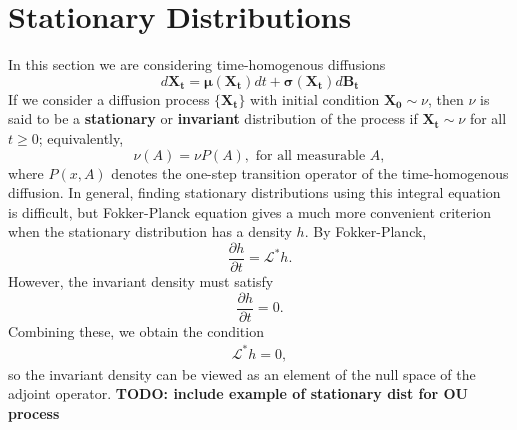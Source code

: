 \documentclass[12pt]{article}
\newcommand{\B}[1]{\boldsymbol{#1}}
\newcommand{\state}[1][t]{X_{#1}}
\newcommand{\BM}[1][t]{B_{#1}} %
\newcommand{\gen}{\mathcal{L}} %
\newcommand{\invariantDens}{h} %
\begin{document}
\section{Stationary Distributions}
In this section we are considering time-homogenous diffusions 
\[
d\B\state = \B\mu(\B\state) dt + \B\sigma(\B\state) d\B\BM
\]
If we consider a diffusion process $\{\B\state\}$ with initial condition $\B{\state[0]} \sim \nu$, then $\nu$ is said to be a \textbf{stationary} or \textbf{invariant}
distribution of the process if $\B\state \sim \nu$ for all $t \geq 0$; equivalently, 
\[
\nu(A) = \nu P(A), \text{ for all measurable } A,
\]
where $P(x,A)$ denotes the one-step transition operator of the time-homogenous diffusion. In general, finding stationary distributions using this integral 
equation is difficult, but Fokker-Planck equation gives a much more convenient criterion when the stationary distribution has a density $\invariantDens$. By Fokker-Planck, 
\[
\frac{\partial \invariantDens}{\partial t} = \gen^* \invariantDens.
\]
However, the invariant density must satisfy 
\[
\frac{\partial \invariantDens}{\partial t} = 0.
\]
Combining these, we obtain the condition 
\begin{align}
\gen^* \invariantDens = 0, 
\end{align}
so the invariant density can be viewed as an element of the null space of the adjoint operator. \textbf{TODO: include example of stationary dist for OU process}
\end{document}
